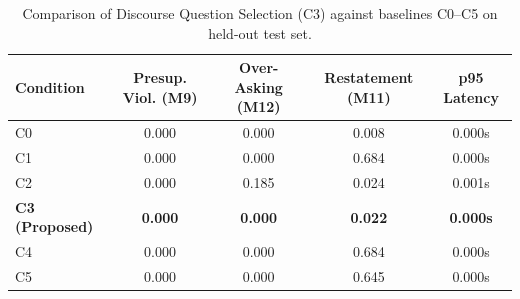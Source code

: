 
\begin{table}[h]
\centering
\caption{Comparison of Discourse Question Selection (C3) against baselines C0--C5 on held-out test set.}
\label{tab:evaluation_results}
\begin{tabular}{lcccc}
\toprule
\textbf{Condition} & \textbf{Presup. Viol. (M9)} & \textbf{Over-Asking (M12)} & \textbf{Restatement (M11)} & \textbf{p95 Latency} \\
\midrule
C0 & 0.000 & 0.000 & 0.008 & 0.000s \\
C1 & 0.000 & 0.000 & 0.684 & 0.000s \\
C2 & 0.000 & 0.185 & 0.024 & 0.001s \\
\textbf{C3 (Proposed)} & \textbf{0.000} & \textbf{0.000} & \textbf{0.022} & \textbf{0.000s} \\
C4 & 0.000 & 0.000 & 0.684 & 0.000s \\
C5 & 0.000 & 0.000 & 0.645 & 0.000s \\
\bottomrule
\end{tabular}
\end{table}
